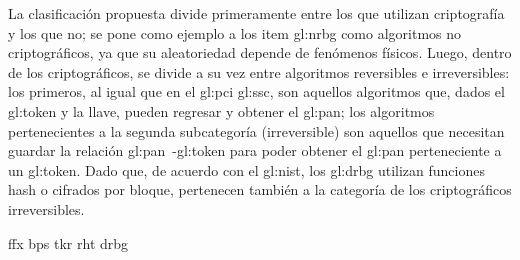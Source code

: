 La clasificación propuesta divide primeramente entre los que utilizan
criptografía y los que no; se pone como ejemplo a los item \gls{gl:nrbg} como
algoritmos no criptográficos, ya que su aleatoriedad depende de fenómenos
físicos. Luego, dentro de los criptográficos, se divide a su vez entre algoritmos
reversibles e irreversibles: los primeros, al igual que en el
\gls{gl:pci} \gls{gl:ssc}, son aquellos algoritmos que, dados el \gls{gl:token}
y la llave, pueden regresar y obtener el \gls{gl:pan}; los algoritmos
pertenecientes a la segunda subcategoría (irreversible) son aquellos que
necesitan guardar la relación \gls{gl:pan}~-\gls{gl:token} para poder obtener
el \gls{gl:pan} perteneciente a un \gls{gl:token}. Dado que, de acuerdo con el
\gls{gl:nist}, los \gls{gl:drbg} utilizan funciones hash o cifrados por
bloque, pertenecen también a la categoría de los criptográficos irreversibles.

{ffx}
{bps}
{tkr}
{rht}
{drbg}
